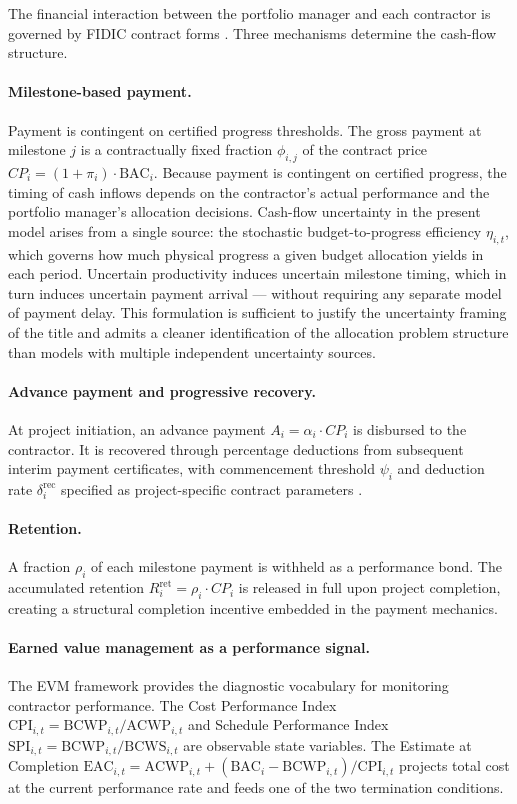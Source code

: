 The financial interaction between the portfolio manager and each contractor
is governed by FIDIC contract forms \citep{FIDIC2017}. Three mechanisms
determine the cash-flow structure.

\paragraph{Milestone-based payment.}
Payment is contingent on certified progress thresholds. The gross payment at
milestone $j$ is a contractually fixed fraction $\phi_{i,j}$ of the contract
price $CP_i = (1 + \pi_i)\cdot\mathrm{BAC}_i$. Because payment is contingent
on certified progress, the timing of cash inflows depends on the contractor's
actual performance and the portfolio manager's allocation decisions.
Cash-flow uncertainty in the present model arises from a single source:
the stochastic budget-to-progress efficiency $\eta_{i,t}$, which governs
how much physical progress a given budget allocation yields in each period.
Uncertain productivity induces uncertain milestone timing, which in turn induces
uncertain payment arrival --- without requiring any separate model of payment
delay. This formulation is sufficient to justify the uncertainty framing
of the title and admits a cleaner identification of the allocation problem
structure than models with multiple independent uncertainty sources.

\paragraph{Advance payment and progressive recovery.}
At project initiation, an advance payment $A_i = \alpha_i \cdot CP_i$ is
disbursed to the contractor. It is recovered through percentage deductions
from subsequent interim payment certificates, with commencement threshold
$\psi_i$ and deduction rate $\delta_i^{\mathrm{rec}}$ specified as
project-specific contract parameters \citep{FIDIC2017}.

\paragraph{Retention.}
A fraction $\rho_i$ of each milestone payment is withheld as a performance
bond. The accumulated retention $R_i^{\mathrm{ret}} = \rho_i \cdot CP_i$
is released in full upon project completion, creating a structural completion
incentive embedded in the payment mechanics.

\paragraph{Earned value management as a performance signal.}
The EVM framework \citep{Fleming2010} provides the diagnostic vocabulary
for monitoring contractor performance. The Cost Performance Index
$\mathrm{CPI}_{i,t} = \mathrm{BCWP}_{i,t}/\mathrm{ACWP}_{i,t}$ and
Schedule Performance Index $\mathrm{SPI}_{i,t} =
\mathrm{BCWP}_{i,t}/\mathrm{BCWS}_{i,t}$ are observable state variables.
The Estimate at Completion $\mathrm{EAC}_{i,t} = \mathrm{ACWP}_{i,t} +
(\mathrm{BAC}_i - \mathrm{BCWP}_{i,t})/\mathrm{CPI}_{i,t}$ projects total
cost at the current performance rate and feeds one of the two termination
conditions.


